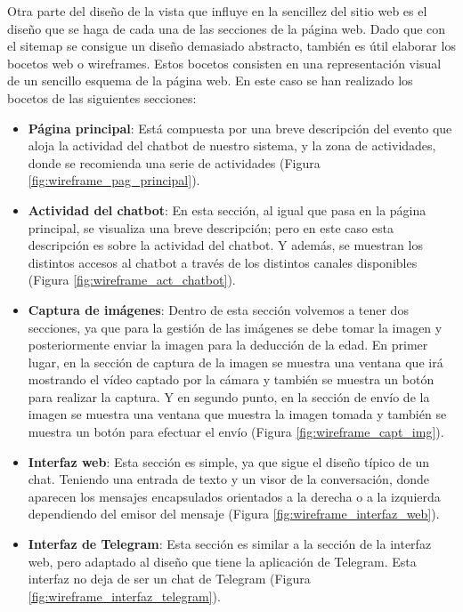 Otra parte del diseño de la vista que influye en la sencillez del sitio web es el diseño que se haga de cada una de las secciones de la página web. Dado que con el sitemap se consigue un diseño demasiado abstracto, también es útil elaborar los bocetos web o wireframes. Estos bocetos consisten en una representación visual de un sencillo esquema de la página web. En este caso se han realizado los bocetos de las siguientes secciones:

\begin{itemize}
\item \textbf{Página principal}: Está compuesta por una breve descripción del evento que aloja la actividad del chatbot de nuestro sistema, y la zona de actividades, donde se recomienda una serie de actividades (Figura \ref{fig:wireframe_pag_principal}).

\item \textbf{Actividad del chatbot}: En esta sección, al igual que pasa en la página principal, se visualiza una breve descripción; pero en este caso esta descripción es sobre la actividad del chatbot. Y además, se muestran los distintos accesos al chatbot a través de los distintos canales disponibles (Figura \ref{fig:wireframe_act_chatbot}).

\item \textbf{Captura de imágenes}: Dentro de esta sección volvemos a tener dos secciones, ya que para la gestión de las imágenes se debe tomar la imagen y posteriormente enviar la imagen para la deducción de la edad. En primer lugar, en la sección de captura de la imagen se muestra una ventana que irá mostrando el vídeo captado por la cámara y también se muestra un botón para realizar la captura. Y en segundo punto, en la sección de envío de la imagen se muestra una ventana que muestra la imagen tomada y también se muestra un botón para efectuar el envío (Figura \ref{fig:wireframe_capt_img}).

\item \textbf{Interfaz web}: Esta sección es simple, ya que sigue el diseño típico de un chat. Teniendo una entrada de texto y un visor de la conversación, donde aparecen los mensajes encapsulados orientados a la derecha o a la izquierda dependiendo del emisor del mensaje (Figura \ref{fig:wireframe_interfaz_web}).

\item \textbf{Interfaz de Telegram}: Esta sección es similar a la sección de la interfaz web, pero adaptado al diseño que tiene la aplicación de Telegram. Esta interfaz no deja de ser un chat de Telegram (Figura \ref{fig:wireframe_interfaz_telegram}).
\end{itemize}



